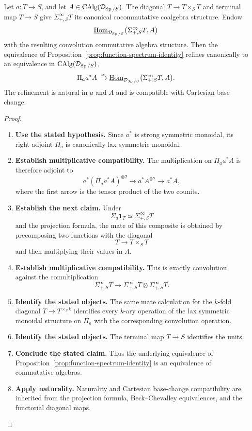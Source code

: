 \begin{proposition}
\label{prop:multiplicative-function-spectrum-identity}
Let \(a:T\to S\), and let \(A\in\operatorname{CAlg}(\mathcal D_{\operatorname{Sp}/S})\). The diagonal
\(T\to T\times_ST\) and terminal map \(T\to S\) give
\(\Sigma^\infty_{+,S}T\) its canonical cocommutative coalgebra structure. Endow
\[
  \underline{\operatorname{Hom}}_{\mathcal D_{\operatorname{Sp}/S}}
  \bigl(\Sigma^\infty_{+,S}T,A\bigr)
\]
with the resulting convolution commutative algebra structure. Then the equivalence
of Proposition~\ref{prop:function-spectrum-identity} refines canonically to an
equivalence in \(\operatorname{CAlg}(\mathcal D_{\operatorname{Sp}/S})\),
\[
  \Pi_aa^*A
  \xrightarrow{\simeq}
  \underline{\operatorname{Hom}}_{\mathcal D_{\operatorname{Sp}/S}}
  \bigl(\Sigma^\infty_{+,S}T,A\bigr).
\]
The refinement is natural in \(a\) and \(A\) and is compatible with Cartesian base
change.
\end{proposition}

\begin{proof}
\leavevmode
\begin{enumerate}[label=\textup{(\arabic*)}]
    \item \textbf{Use the stated hypothesis.}
    Since \(a^*\) is strong symmetric monoidal, its right adjoint \(\Pi_a\) is
    canonically lax symmetric monoidal.
    \item \textbf{Establish multiplicative compatibility.}
    The multiplication on
    \(\Pi_aa^*A\) is therefore adjoint to
    \[
    a^*(\Pi_aa^*A)^{\otimes2}
    \longrightarrow
    a^*A^{\otimes2}
    \longrightarrow
    a^*A,
    \]
    where the first arrow is the tensor product of the two counits.
    \item \textbf{Establish the next claim.}
    Under
    \[
    \Sigma_a\mathbf1_T\simeq\Sigma^\infty_{+,S}T
    \]
    and the projection formula, the mate of this composite is obtained by
    precomposing two functions with the diagonal
    \[
    T\longrightarrow T\times_ST
    \]
    and then multiplying their values in \(A\).
    \item \textbf{Establish multiplicative compatibility.}
    This is exactly convolution against
    the comultiplication
    \[
    \Sigma^\infty_{+,S}T
    \longrightarrow
    \Sigma^\infty_{+,S}T\otimes\Sigma^\infty_{+,S}T.
    \]
    \item \textbf{Identify the stated objects.}
    The same mate calculation for the \(k\)-fold diagonal
    \(T\to T^{\times_Sk}\) identifies every \(k\)-ary operation of the lax symmetric
    monoidal structure on \(\Pi_a\) with the corresponding convolution operation.
    \item \textbf{Identify the stated objects.}
    The terminal map \(T\to S\) identifies the units.
    \item \textbf{Conclude the stated claim.}
    Thus the underlying
    equivalence of Proposition~\ref{prop:function-spectrum-identity} is an equivalence
    of commutative algebras.
    \item \textbf{Apply naturality.}
    Naturality and Cartesian base-change compatibility are
    inherited from the projection formula, Beck--Chevalley equivalences, and the
    functorial diagonal maps.
\end{enumerate}
\end{proof}

